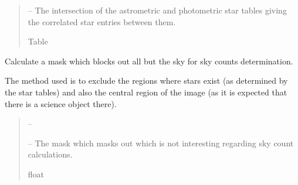 \documentclass[letterpaper,11pt,english]{sphinxmanual}
\begin{document}
\begin{savenotes}
\begin{fulllineitems}
\begin{savenotes}
\begin{fulllineitems}
\begin{quote}
\begin{description}
\sphinxAtStartPar
{} – The intersection of the astrometric and photometric star tables
giving the correlated star entries between them.

\sphinxAtStartPar
Table

\end{description}\end{quote}

\end{fulllineitems}\end{savenotes}


\begin{savenotes}\begin{fulllineitems}
\label{\detokenize{code/opihiexarata.photometry.solution:opihiexarata.photometry.solution.PhotometricSolution.__calculate_sky_counts_mask}}
\pysigstartsignatures
{}
\pysigstopsignatures
\sphinxAtStartPar
Calculate a mask which blocks out all but the sky for sky counts
determination.

\sphinxAtStartPar
The method used is to exclude the regions where stars exist (as
determined by the star tables) and also the central region
of the image (as it is expected that there is a science object there).
\begin{quote}\begin{description}
\sphinxAtStartPar
{} – 

\sphinxAtStartPar
{} – The mask which masks out which is not interesting regarding sky
count calculations.

\sphinxAtStartPar
float

\end{description}\end{quote}


\end{fulllineitems}
\end{savenotes}
\end{fulllineitems}
\end{savenotes}
\end{document}
